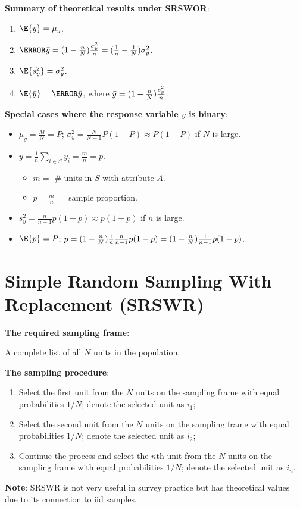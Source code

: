 \textbf{Summary of theoretical results under SRSWOR}:
\begin{enumerate}[1]
      \item $ \E{\bar{y}}=\mu_y $.
      \item $ \V{\bar{y}}=(1-\frac{n}{N})\frac{\sigma_y^2}{n}=(\frac{1}{n}-\frac{1}{N})\sigma_y^2 $.
      \item $ \E{s_y^2}=\sigma_y^2 $.
      \item $ \E{\v{\bar{y}}}=\V{\bar{y}} $, where $ \relax{\bar{y}}=(1-\frac{n}{N})\frac{s_y^2}{n} $.
\end{enumerate}
\textbf{Special cases where the response variable $y$ is binary}:
\begin{itemize}
      \item $ \mu_y=\frac{M}{N}=P $; $ \sigma_y^2=\frac{N}{N-1}P(1-P)\approx P(1-P) $ if $ N $ is large.
      \item $ \bar{y}=\frac{1}{n}\sum_{i\in S}y_i=\frac{m}{n}=p $.
            \begin{itemize}
                  \item $ m= $ \# units in $ S $ with attribute $ A $.
                  \item $ p=\frac{m}{n}= $ sample proportion.
            \end{itemize}
      \item $ s_y^2=\frac{n}{n-1}p(1-p)\approx p(1-p) $ if $ n $ is large.
      \item $ \E{p}=P $; $ \relax{p}=(1-\frac{n}{N})\frac{1}{n}\frac{n}{n-1}p(1-p)=(1-\frac{n}{N})\frac{1}{n-1}p(1-p) $.
\end{itemize}

\section{Simple Random Sampling With Replacement (SRSWR)}
\textbf{The required sampling frame}:

A complete list of all $ N $ units in the population.

\textbf{The sampling procedure}:
\begin{enumerate}
      \item Select the first unit from the $N$ units on the sampling frame with
            equal probabilities $1/N$; denote the selected unit as $ i_1 $;
      \item Select the second unit from the $N$ units on the sampling frame
            with equal probabilities $1/N$; denote the selected unit as $ i_2 $;
      \item Continue the process and select the $n$th unit from the $N$ units on
            the sampling frame with equal probabilities $1/N$; denote the
            selected unit as $ i_n $.
\end{enumerate}
\textbf{Note}: SRSWR is not very useful in survey practice but has theoretical
values due to its connection to iid samples.

